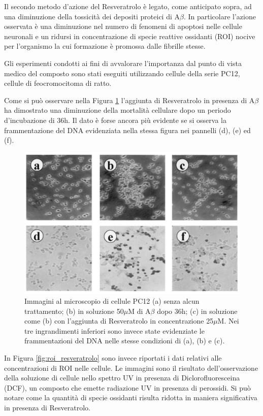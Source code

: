 \documentclass[a4paper, 12pt]{article}
\begin{document}
Il secondo metodo d'azione del Resveratrolo è legato, come anticipato sopra, ad una diminuzione della tossicità dei depositi proteici di A$\beta$. In particolare l'azione osservata è una diminuzione nel numero di fenomeni di  apoptosi nelle cellule neuronali e un ridursi in concentrazione di specie reattive ossidanti (ROI) nocive per l'organismo la cui formazione è promossa dalle fibrille stesse.

Gli esperimenti condotti ai fini di avvalorare l'importanza dal punto di vista medico del composto sono stati eseguiti utilizzando cellule della serie PC12, cellule di feocromocitoma di ratto.

Come si può osservare nella Figura \ref{fig:apo_resveratrolo} l'aggiunta di Resveratrolo in presenza di A$\beta$ ha dimostrato una diminuzione della mortalità cellulare dopo un periodo d'incubazione di 36h. Il dato è forse ancora più evidente se si osserva la frammentazione del DNA evidenziata nella stessa figura nei pannelli (d), (e) ed (f).

\begin{figure}[H]
	\centering
	\includegraphics[width=\linewidth]{immagini/apo_resveratrolo.png}
	\caption{Immagini al microscopio di cellule PC12 (a) senza alcun trattamento; (b) in soluzione 50$\mu$M di A$\beta$ dopo 36h; (c) in soluzione come (b) con l'aggiunta di Resveratrolo in concentrazione 25$\mu$M. Nei tre ingrandimenti inferiori sono invece state evidenziate le frammentazioni del DNA nelle stesse condizioni di (a), (b) e (c).}
	\label{fig:apo_resveratrolo}
\end{figure}

In Figura \ref{fig:roi_resveratrolo} sono invece riportati i dati relativi alle concentrazioni di ROI nelle cellule. Le immagini sono il risultato dell'osservazione della soluzione di cellule nello spettro UV in presenza di Diclorofluoresceina (DCF), un composto che emette radiazione UV in presenza di perossidi. Si può notare come la quantità di specie ossidanti risulta ridotta in maniera significativa in presenza di Resveratrolo. \cite{noauthor_protective_2003}
\end{document}
